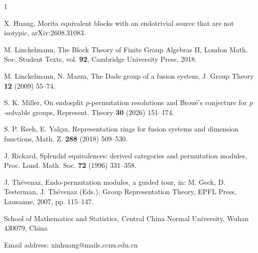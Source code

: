 \documentclass[preprint,12pt,3p]{elsarticle}
\begin{document}
\begin{thebibliography}{1}
	
	
	
	X. Huang, Morita equivalent blocks with an endotrivial source that are not isotypic, arXiv:2608.31083.
	
	
	
	
	
	
	
	
	
	M. Linckelmann, The Block Theory of Finite Group Algebras II, London Math. Soc. Student Texts, vol. {\bf92}, Cambridge University Press, 2018.

	M. Linckelmann, N. Mazza, The Dade group of a fusion system,
	J. Group Theory {\bf 12} (2009) 55--74.
	

	
	S. K. Miller, On endosplit $p$-permutation resolutions and Brou\'{e}'s conjecture for $p$-solvable groups, Represent. Theory {\bf 30} (2026) 151--174.
	

	
	
	
	
	

	
	
	
	S. P. Reeh, E. Yal\c{c}\i n, Representation rings for fusion systems and dimension functions, Math. Z. {\bf 288} (2018) 509--530.

	J. Rickard, Splendid equivalences: derived categories and permutation modules, Proc. Lond. Math. Soc. {\bf 72} (1996) 331--358.
	
	
	
	
	J. Th\'{e}venaz, Endo-permutation modules, a guided tour, in: M. Geck, D. Testerman, J. Th\'{e}venaz (Eds.), Group Representation Theory, EPFL Press, Lausanne, 2007, pp. 115--147. 
	

	
\end{thebibliography}


\bigskip
{\footnotesize School of Mathematics and Statistics, Central China Normal University, Wuhan 430079, China 
	
	Email address: xinhuang@mails.ccnu.edu.cn}
\end{document}
